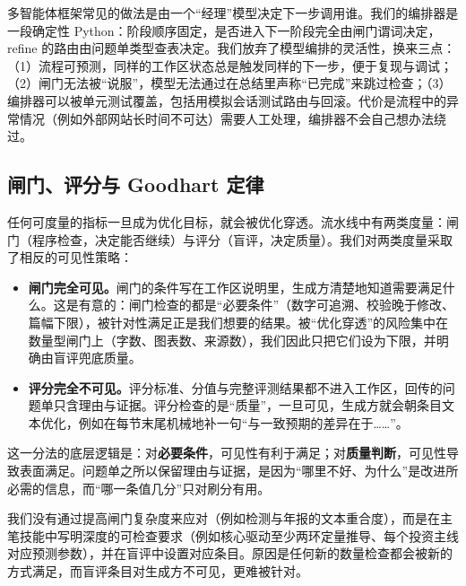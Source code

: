 \begin{tradeoff}
多智能体框架常见的做法是由一个“经理”模型决定下一步调用谁。我们的编排器是一段确定性 Python：阶段顺序固定，是否进入下一阶段完全由闸门谓词决定，refine 的路由由问题单类型查表决定。我们放弃了模型编排的灵活性，换来三点：（1）流程可预测，同样的工作区状态总是触发同样的下一步，便于复现与调试；（2）闸门无法被“说服”，模型无法通过在总结里声称“已完成”来跳过检查；（3）编排器可以被单元测试覆盖，包括用模拟会话测试路由与回滚。代价是流程中的异常情况（例如外部网站长时间不可达）需要人工处理，编排器不会自己想办法绕过。
\end{tradeoff}

\subsection{闸门、评分与 Goodhart 定律}
\label{sec:disc-goodhart}

任何可度量的指标一旦成为优化目标，就会被优化穿透。流水线中有两类度量：闸门（程序检查，决定能否继续）与评分（盲评，决定质量）。我们对两类度量采取了相反的可见性策略：

\begin{itemize}
  \item \textbf{闸门完全可见。}闸门的条件写在工作区说明里，生成方清楚地知道需要满足什么。这是有意的：闸门检查的都是“必要条件”（数字可追溯、校验晚于修改、篇幅下限），被针对性满足正是我们想要的结果。被“优化穿透”的风险集中在数量型闸门上（字数、图表数、来源数），我们因此只把它们设为下限，并明确由盲评兜底质量。
  \item \textbf{评分完全不可见。}评分标准、分值与完整评测结果都不进入工作区，回传的问题单只含理由与证据。评分检查的是“质量”，一旦可见，生成方就会朝条目文本优化，例如在每节末尾机械地补一句“与一致预期的差异在于……”。
\end{itemize}

这一分法的底层逻辑是：对\textbf{必要条件}，可见性有利于满足；对\textbf{质量判断}，可见性导致表面满足。问题单之所以保留理由与证据，是因为“哪里不好、为什么”是改进所必需的信息，而“哪一条值几分”只对刷分有用。

\begin{failcase}[：数量下限的边界]
我们没有通过提高闸门复杂度来应对（例如检测与年报的文本重合度），而是在主笔技能中写明深度的可检查要求（例如核心驱动至少两环定量推导、每个投资主线对应预测参数），并在盲评中设置对应条目。原因是任何新的数量检查都会被新的方式满足，而盲评条目对生成方不可见，更难被针对。
\end{failcase}

